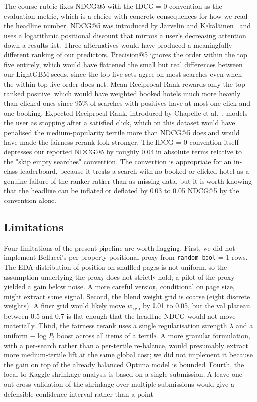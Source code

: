 \documentclass[runningheads]{llncs}
\begin{document}
The course rubric fixes NDCG@5 with the IDCG = 0 convention as the evaluation metric, which is a choice with concrete consequences for how we read the headline number. NDCG@5 was introduced by J\"arvelin and Kek\"al\"ainen~\cite{jarvelin2002ndcg} and uses a logarithmic positional discount that mirrors a user's decreasing attention down a results list. Three alternatives would have produced a meaningfully different ranking of our predictors. Precision@5 ignores the order within the top five entirely, which would have flattened the small but real differences between our LightGBM seeds, since the top-five sets agree on most searches even when the within-top-five order does not. Mean Reciprocal Rank rewards only the top-ranked positive, which would have weighted booked hotels much more heavily than clicked ones since 95\% of searches with positives have at most one click and one booking. Expected Reciprocal Rank, introduced by Chapelle et al.~\cite{chapelle2009expected}, models the user as stopping after a satisfied click, which on this dataset would have penalised the medium-popularity tertile more than NDCG@5 does and would have made the fairness rerank look stronger. The IDCG = 0 convention itself depresses our reported NDCG@5 by roughly 0.04 in absolute terms relative to the "skip empty searches" convention. The convention is appropriate for an in-class leaderboard, because it treats a search with no booked or clicked hotel as a genuine failure of the ranker rather than as missing data, but it is worth knowing that the headline can be inflated or deflated by 0.03 to 0.05 NDCG@5 by the convention alone.

\subsection{Limitations}

Four limitations of the present pipeline are worth flagging. First, we did not implement Bellucci's per-property positional proxy from \texttt{random\_bool} = 1 rows. The EDA distribution of position on shuffled pages is not uniform, so the assumption underlying the proxy does not strictly hold; a pilot of the proxy yielded a gain below noise. A more careful version, conditional on page size, might extract some signal. Second, the blend weight grid is coarse (eight discrete weights). A finer grid would likely move $w_{\text{xgb}}$ by 0.01 to 0.05, but the val plateau between 0.5 and 0.7 is flat enough that the headline NDCG would not move materially. Third, the fairness rerank uses a single regularisation strength $\lambda$ and a uniform $-\log P_t$ boost across all items of a tertile. A more granular formulation, with a per-search rather than a per-tertile re-balance, would presumably extract more medium-tertile lift at the same global cost; we did not implement it because the gain on top of the already balanced Optuna model is bounded. Fourth, the local-to-Kaggle shrinkage analysis is based on a single submission. A leave-one-out cross-validation of the shrinkage over multiple submissions would give a defensible confidence interval rather than a point.
\end{document}
